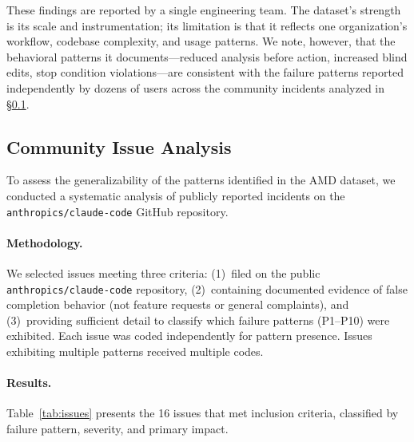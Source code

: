 These findings are reported by a single engineering team.
The dataset's strength is its scale and instrumentation; its limitation is that it reflects one organization's workflow, codebase complexity, and usage patterns.
We note, however, that the behavioral patterns it documents---reduced analysis before action, increased blind edits, stop condition violations---are consistent with the failure patterns reported independently by dozens of users across the community incidents analyzed in \S\ref{sec:community-issues}.


\subsection{Community Issue Analysis}
\label{sec:community-issues}

To assess the generalizability of the patterns identified in the AMD dataset, we conducted a systematic analysis of publicly reported incidents on the \texttt{anthropics/claude-code} GitHub repository.

\paragraph{Methodology.}
We selected issues meeting three criteria: (1)~filed on the public \texttt{anthropics/claude-code} repository, (2)~containing documented evidence of false completion behavior (not feature requests or general complaints), and (3)~providing sufficient detail to classify which failure patterns (P1--P10) were exhibited.
Each issue was coded independently for pattern presence.
Issues exhibiting multiple patterns received multiple codes.

\paragraph{Results.}
Table~\ref{tab:issues} presents the 16 issues that met inclusion criteria, classified by failure pattern, severity, and primary impact.

